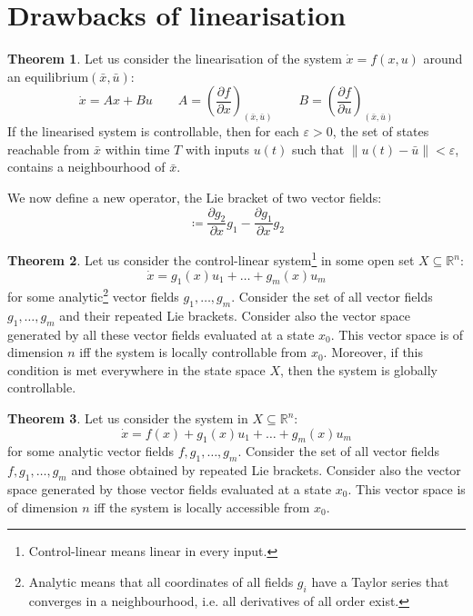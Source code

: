 \documentclass[12pt, openany]{report}
\theoremstyle{definition}
\newtheorem{thm}{Theorem}[chapter]
\newcommand{\R}{\mathbb{R}}
\begin{document}
\section{Drawbacks of linearisation}
\begin{thm}
Let us consider the linearisation of the system \(\dot x=f(x,u)\) around an equilibrium\((\bar x,\bar u)\): 
\begin{equation}
    \dot x = Ax+Bu \qquad A= \left(\frac{\partial f}{\partial x}\right)_{(\bar x,\bar u)} \qquad B = \left(\frac{\partial f}{\partial u}\right)_{(\bar x,\bar u)}
\end{equation}
If the linearised system is controllable, then for each \(\varepsilon >0\), the set of states reachable from \(\bar x\) within time \(T\) with inputs \(u(t)\) such that \(\lVert u(t)-\bar u\rVert <\varepsilon \), contains a neighbourhood of \(\bar x\).
\end{thm}
We now define a new operator, the Lie bracket of two vector fields:
\begin{equation}
    [g_1,g_2] \coloneqq \frac{\partial g_2}{\partial x}g_1-\frac{\partial g_1}{\partial x}g_2
\end{equation}
\begin{thm}
    Let us consider the control-linear system\footnote{Control-linear means linear in every input.} in some open set \(X\subseteq \R^n\):
    \begin{equation}
        \dot x= g_1(x)u_1 + \dots + g_m(x)u_m
    \end{equation}
    for some analytic\footnote{Analytic means that all coordinates of all fields \(g_i\) have a Taylor series that converges in a neighbourhood, i.e. all derivatives of all order exist.} vector fields \(g_1,\dots,g_m\). Consider the set of all vector fields \(g_1,\dots,g_m\) and their repeated Lie brackets. Consider also the vector space generated by all these vector fields evaluated at a state \(x_0\). This vector space is of dimension \(n\) iff the system is locally controllable from \(x_0\). Moreover, if this condition is met everywhere in the state space \(X\), then the system is globally controllable.
\end{thm}
\begin{thm}
    Let us consider the system in \(X\subseteq \R^n\):
    \begin{equation}
        \dot x=f(x)+g_1(x)u_1 + \dots + g_m(x)u_m
    \end{equation}
    for some analytic vector fields \(f,g_1,\dots,g_m\). Consider the set of all vector fields \(f,g_1,\dots,g_m\) and those obtained by repeated Lie brackets. Consider also the vector space generated by those vector fields evaluated at a state \(x_0\). This vector space is of dimension \(n\) iff the system is locally accessible from \(x_0\).
\end{thm}
\end{document}
